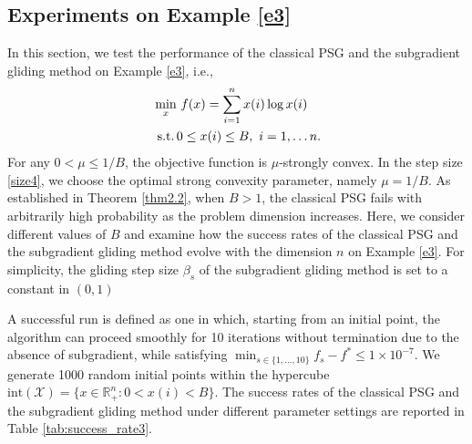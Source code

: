 \documentclass[sn-mathphys]{JORSC-jnl}%
\theoremstyle{thmstyleone}%
\theoremstyle{thmstylethree}%
\def\ST{\songti\rm\relax}
\def\R{{\mathbb R}}
\def\ST{{\rm s.t.}}
\begin{document}
\subsection{Experiments on Example \ref{e3}}
In this section, we test the performance of the classical PSG and the subgradient gliding method on Example \ref{e3}, i.e.,
\begin{equation}
	\begin{alignedat}{2}
		&\min_{x} && ~ f(x)=\sum_{i=1}^{n} x(i) \log x(i)\\
		&~\ST&&0 \le x(i) \le B,~ i = 1,\dots n.
		\label{m3}
	\end{alignedat}
\end{equation}
For any $0 < \mu \le 1/B$, the objective function is $\mu$-strongly convex. In the step size \eqref{size4}, we choose the optimal strong convexity parameter, namely $\mu = 1/B$. As established in Theorem \ref{thm2.2}, when $B > 1$, the classical PSG fails with arbitrarily high probability as the problem dimension increases. Here, we consider different values of $B$ and examine how the success rates of the classical PSG and the subgradient gliding method evolve with the dimension $n$ on Example \ref{e3}. For simplicity, the gliding step size $\beta_s$ of the subgradient gliding method is set to a constant in $(0,1)$

A successful run is defined as one in which, starting from an initial point, the algorithm can proceed smoothly for 10 iterations without termination due to the absence of subgradient, while satisfying $\min_{s \in \{1,\dots,10\}} f_s - f^* \le 1 \times 10^{-7}$. We generate 1000 random initial points within the hypercube $\text{int}(\mathcal{X})=\{x \in\R_+^n: 0 < x(i) < B\}$. The success rates of the classical PSG and the subgradient gliding method under different parameter settings are reported in Table \ref{tab:success_rate3}.
\end{document}
